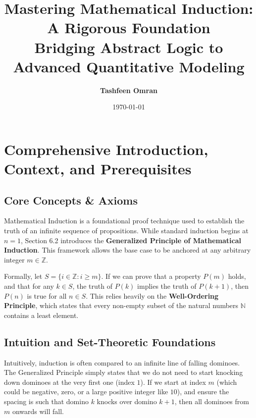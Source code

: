 \documentclass[11pt, a4paper]{article}
\theoremstyle{definition}
\theoremstyle{remark}
\newcommand{\N}{\mathbb{N}}
\newcommand{\Z}{\mathbb{Z}}
\begin{document}
\title{\Huge \textbf{Mastering Mathematical Induction: A Rigorous Foundation} \\ \Large \vspace{10pt} Bridging Abstract Logic to Advanced Quantitative Modeling}
\author{\textbf{Tashfeen Omran}}
\date{\today}

\maketitle
\tableofcontents
\newpage

\section{Comprehensive Introduction, Context, and Prerequisites}

\subsection{Core Concepts \& Axioms}
Mathematical Induction is a foundational proof technique used to establish the truth of an infinite sequence of propositions. While standard induction begins at $n = 1$, Section 6.2 introduces the \textbf{Generalized Principle of Mathematical Induction}. This framework allows the base case to be anchored at any arbitrary integer $m \in \Z$. 

Formally, let $S = \{i \in \Z : i \ge m\}$. If we can prove that a property $P(m)$ holds, and that for any $k \in S$, the truth of $P(k)$ implies the truth of $P(k+1)$, then $P(n)$ is true for all $n \in S$. This relies heavily on the \textbf{Well-Ordering Principle}, which states that every non-empty subset of the natural numbers $\N$ contains a least element.

\subsection{Intuition and Set-Theoretic Foundations}
Intuitively, induction is often compared to an infinite line of falling dominoes. The Generalized Principle simply states that we do not need to start knocking down dominoes at the very first one (index $1$). If we start at index $m$ (which could be negative, zero, or a large positive integer like $10$), and ensure the spacing is such that domino $k$ knocks over domino $k+1$, then all dominoes from $m$ onwards will fall. 
\end{document}
